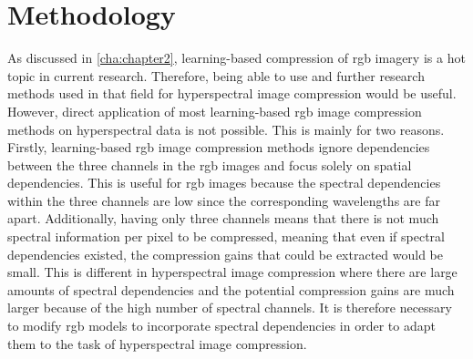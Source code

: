 \chapter{Methodology\label{cha:chapter4}}
As discussed in \autoref{cha:chapter2}, learning-based compression of \ac{rgb} imagery is a hot topic in current research. Therefore, being able to use and further research methods used in that field for hyperspectral image compression would be useful. However, direct application of most learning-based \ac{rgb} image compression methods on hyperspectral data is not possible. This is mainly for two reasons. Firstly, learning-based \ac{rgb} image compression methods ignore dependencies between the three channels in the \ac{rgb} images and focus solely on spatial dependencies. This is useful for \ac{rgb} images because the spectral dependencies within the three channels are low since the corresponding wavelengths are far apart. Additionally, having only three channels means that there is not much spectral information per pixel to be compressed, meaning that even if spectral dependencies existed, the compression gains that could be extracted would be small. This is different in hyperspectral image compression where there are large amounts of spectral dependencies and the potential compression gains are much larger because of the high number of spectral channels. It is therefore necessary to modify \ac{rgb} models to incorporate spectral dependencies in order to adapt them to the task of hyperspectral image compression. 

